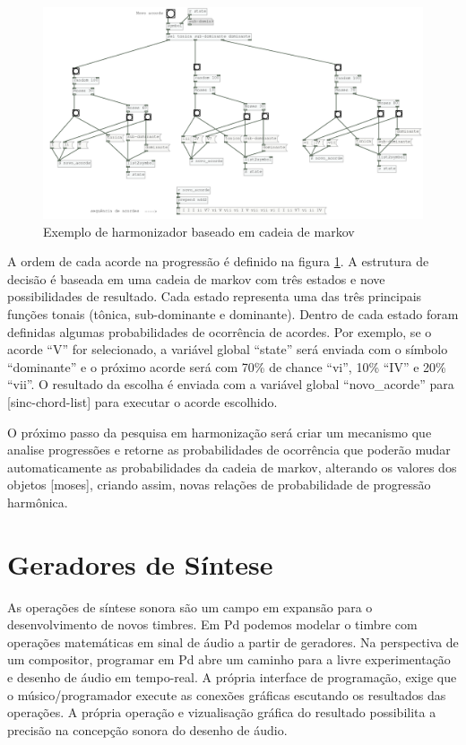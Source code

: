\documentclass[draft]{ppgmus}
\begin{document}
\begin{figure}
\includegraphics[scale=.5]{harm-markov}
\caption{Exemplo de harmonizador baseado em cadeia de markov}
\label{harm-markov}
\end{figure}

A ordem de cada acorde na progressão é definido na figura \ref{harm-markov}.
A estrutura de decisão é baseada em uma cadeia de markov com três estados e 
nove possibilidades de resultado. Cada estado representa uma das três principais
funções tonais (tônica, sub-dominante e dominante). Dentro de cada estado foram definidas
algumas probabilidades de ocorrência de acordes. Por exemplo, se o acorde ``V'' 
for selecionado, a variável global ``state'' será enviada com o símbolo ``dominante'' e o próximo
acorde será com 70\% de chance ``vi'', 10\% ``IV'' e 20\% ``vii''. O resultado da escolha 
é enviada com a variável global ``novo\_acorde'' para [sinc-chord-list] para executar o
acorde escolhido.

O próximo passo da pesquisa em harmonização será criar um mecanismo que analise progressões
 e retorne as probabilidades de ocorrência que poderão mudar automaticamente as probabilidades
da cadeia de markov, alterando os valores dos objetos [moses], criando assim, novas relações
de probabilidade de progressão harmônica.

\pagebreak

\section{Geradores de Síntese}

As operações de síntese sonora são um campo em expansão para o
desenvolvimento de novos timbres. Em Pd podemos modelar
o timbre com operações matemáticas em sinal de
áudio a partir de geradores.
Na perspectiva de um compositor, programar em Pd abre um caminho
 para a livre experimentação e desenho
de áudio em tempo-real. A própria interface de
programação, exige que o músico/programador execute as 
conexões gráficas escutando os resultados das operações.
 A própria operação e vizualisação gráfica 
do resultado possibilita a precisão na concepção sonora do desenho
de áudio. 
\end{document}
